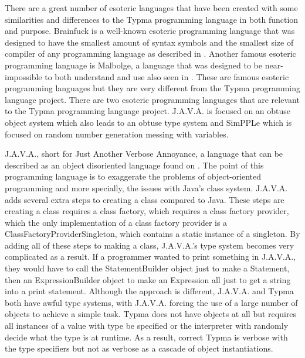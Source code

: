 \documentclass[10pt,twocolumn]{article}
\begin{document}
There are a great number of esoteric languages that have been created with some similarities and differences to the Typma programming language in both function and purpose. Brainfuck is a well-known esoteric programming language that was designed to have the smallest amount of syntax symbols and the smallest size of compiler of any programming language as described in \textcite{Morr2014Esoteric}. Another famous esoteric programming language is Malbolge, a language that was designed to be near-impossible to both understand and use also seen in \textcite{Morr2014Esoteric}. These are famous esoteric programming languages but they are very different from the Typma programming language project. There are two esoteric programming languages that are relevant to the Typma programming language project. J.A.V.A. is focused on an obtuse object system which also leads to an obtuse type system and SimPPLe which is focused on random number generation messing with variables.

J.A.V.A., short for Just Another Verbose Annoyance, a language that can be described as an object disoriented language found on \textcite{J.A.V.A.}. The point of this programming language is to exaggerate the problems of object-oriented programming and more specially, the issues with Java's class system. J.A.V.A. adds several extra steps to creating a class compared to Java. These steps are creating a class requires a class factory, which requires a class factory provider, which the only implementation of a class factory provider is a ClassFactoryProviderSingleton, which contains a static instance of a singleton. By adding all of these steps to making a class, J.A.V.A.'s type system becomes very complicated as a result. If a programmer wanted to print something in J.A.V.A., they would have to call the StatementBuilder object just to make a Statement, then an ExpressionBuilder object to make an Expression all just to get a string into a print statement. Although the approach is different, J.A.V.A. and Typma both have awful type systems, with J.A.V.A. forcing the use of a large number of objects to achieve a simple task. Typma does not have objects at all but requires all instances of a value with type be specified or the interpreter with randomly decide what the type is at runtime. As a result, correct Typma is verbose with the type specifiers but not as verbose as a cascade of object instantiations. 
\end{document}
